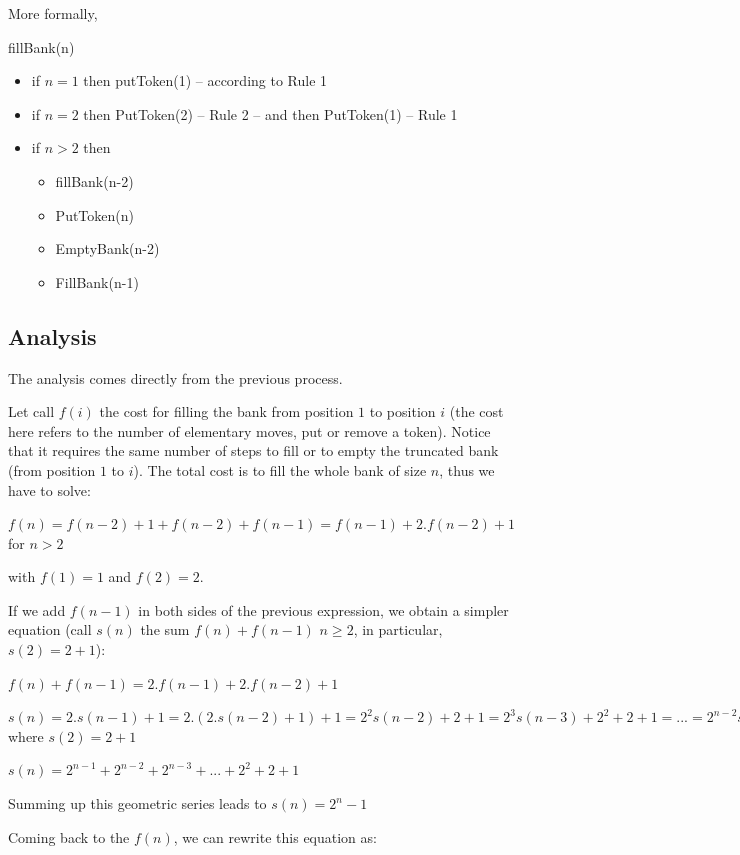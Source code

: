More formally,
\bigskip

fillBank(n)
\begin{itemize}
\item
 if $n=1$ then putToken(1) -- according to Rule 1
\item
if $n=2$ then PutToken(2) -- Rule 2 -- and then PutToken(1) -- Rule 1

\item 
if $n > 2$ then
\begin{itemize}
\item fillBank(n-2)
\item PutToken(n)
\item EmptyBank(n-2)
\item FillBank(n-1)
\end{itemize}
\end{itemize}

\subsection{Analysis}

The analysis comes directly from the previous process. 

Let call $f(i)$ the cost for filling the bank from position $1$ to position $i$
(the cost here refers to the number of elementary moves, put or remove a token).
Notice that it requires the same number of steps to fill or to empty the truncated bank (from position $1$ to $i$). 
The total cost is to fill the whole bank of size $n$, thus we have to solve:

$f(n) = f(n-2) + 1 + f(n-2) + f(n-1) = f(n-1) + 2.f(n-2) +1$ for $n > 2$

with $f(1) = 1$ and $f(2) = 2$.
\bigskip

If we add $f(n-1)$ in both sides of the previous expression, we obtain a simpler equation (call $s(n)$ the sum $f(n)+f(n-1)$ $n \geq 2$,
in particular, $s(2) = 2+1$):

$f(n) + f(n-1) = 2.f(n-1) + 2.f(n-2) +1$

$s(n) = 2.s(n-1)+1 = 2.(2.s(n-2)+1) + 1 = 2^2 s(n-2) + 2+ 1 = 2^3 s(n-3) + 2^2 + 2 + 1 = ... = 2^{n-2} s(2) + 2^{n-3} + ... + 2^2 + 2 + 1$ where $s(2) = 2+1$

$s(n) = 2^{n-1} + 2^{n-2} + 2^{n-3} + ... + 2^2 + 2 + 1$ 

Summing up this geometric series leads to
$s(n) = 2^{n} -1$
\bigskip

Coming back to the $f(n)$, we can rewrite this equation as:

